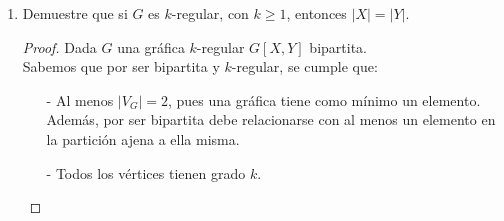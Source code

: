 \documentclass{article}
\begin{document}
\begin{enumerate}
\begin{enumerate}
\begin{proof}
\begin{itemize}
            Supongamos que $G[X, Y_k]$ es una gr\'afica
            bipartita y $\sum_{v \in X}d(v) = \sum_{v \in Y_k}d(v)$. \\

          \item PASO INDUCTIVO: $(n=k+1)$

            Sea $G[X,Y_{k+1}]$ funci\'on bipartita. \\
            Demostraremos que $\sum_{v \in X} d(v) = \sum_{v \in Y_{k+1}}d(v)$.

            Por hip\'otesis de inducci\'on, tenemos que $\sum_{v \in X}d(v) = \sum_{v \in Y_k}d(v)$. Luego, si agregamos un v\'ertice a Y$_k$, tenemos que $|Y_k|+1 = |Y_{k+1}|$. \\
            Por defici\'on de gr\'afica bipartita, existir\'an v\'ertices de $X$ que son adyacentes
            con el nuevo v\'ertice en $Y$. \\
            Sea $q$ el número de nuevas relaciones entre $X$ y el nuevo v\'ertice en $Y$. \\
            Vemos que el grado del nuevo v\'ertice en $Y$ es igual a $q$. Entonces:
            $$\sum_{v \in X} d(v) = \sum_{v \in Y_k}d(v) + q =  \sum_{v \in Y_{k+1}}d(v)$$
        \end{itemize}

        Por lo tanto, para toda $G$ tenemos que $\sum_{v \in X}d(v) = \sum_{v \in Y}d(v)$.
        \end{proof}

      \item Demuestre que si $G$ es $k$-regular, con $k \ge 1$, entonces
        $|X| = |Y|$.

        \begin{proof}
          Dada $G$ una gr\'afica $k$-regular $G[X,Y]$ bipartita. \\
          Sabemos que por ser bipartita y $k$-regular, se cumple que:

          \begin{itemize}
            \item[-] Al menos $|V_G|=2$, pues una gr\'afica tiene como m\'inimo
            un elemento. Adem\'as, por ser bipartita debe relacionarse con al
            menos un elemento en la partici\'on ajena a ella misma.

            \item[-] Todos los v\'ertices tienen grado $k$.
          \end{itemize}


\end{proof}
\end{enumerate}
\end{enumerate}
\end{document}
